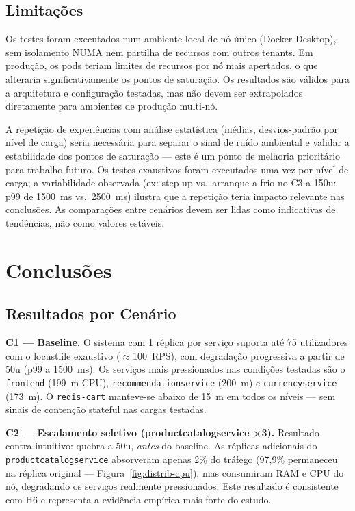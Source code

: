 \documentclass[acmsmall,screen=true,nonacm]{acmart}
\begin{document}
\subsection{Limitações}

Os testes foram executados num ambiente local de nó único (Docker Desktop), sem isolamento NUMA nem partilha de recursos com outros tenants. Em produção, os pods teriam limites de recursos por nó mais apertados, o que alteraria significativamente os pontos de saturação. Os resultados são válidos para a arquitetura e configuração testadas, mas não devem ser extrapolados diretamente para ambientes de produção multi-nó.

A repetição de experiências com análise estatística (médias, desvios-padrão por nível de carga) seria necessária para separar o sinal de ruído ambiental e validar a estabilidade dos pontos de saturação — este é um ponto de melhoria prioritário para trabalho futuro. Os testes exaustivos foram executados uma vez por nível de carga; a variabilidade observada (ex: step-up vs.\ arranque a frio no C3 a 150u: p99 de 1500~ms vs.\ 2500~ms) ilustra que a repetição teria impacto relevante nas conclusões. As comparações entre cenários devem ser lidas como indicativas de tendências, não como valores estáveis.

\section{Conclusões}

\subsection{Resultados por Cenário}

\textbf{C1 — Baseline.} O sistema com 1 réplica por serviço suporta até 75 utilizadores com o locustfile exaustivo ($\approx$100~RPS), com degradação progressiva a partir de 50u (p99 a 1500~ms). Os serviços mais pressionados nas condições testadas são o \texttt{frontend} (199~m CPU), \texttt{recommendationservice} (200~m) e \texttt{currencyservice} (173~m). O \texttt{redis-cart} manteve-se abaixo de 15~m em todos os níveis — sem sinais de contenção stateful nas cargas testadas.

\textbf{C2 — Escalamento seletivo (productcatalogservice ×3).} Resultado contra-intuitivo: quebra a 50u, \emph{antes} do baseline. As réplicas adicionais do \texttt{productcatalogservice} absorveram apenas 2\% do tráfego (97,9\% permaneceu na réplica original — Figura~\ref{fig:distrib-cpu}), mas consumiram RAM e CPU do nó, degradando os serviços realmente pressionados. Este resultado é consistente com H6 e representa a evidência empírica mais forte do estudo.
\end{document}
